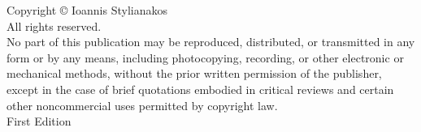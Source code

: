 \thispagestyle{empty}

\begin{center}
\vspace*{\fill}

{\small
Copyright © \the\year{} Ioannis Stylianakos\\[0.5cm]
All rights reserved.\\[0.5cm]

No part of this publication may be reproduced, distributed, or transmitted in any form or by any means, 
including photocopying, recording, or other electronic or mechanical methods, without the prior written 
permission of the publisher, except in the case of brief quotations embodied in critical reviews and 
certain other noncommercial uses permitted by copyright law.\\[0.5cm]

First Edition\\[0.5cm]

}

\vspace*{\fill}
\end{center}

\clearpage  %